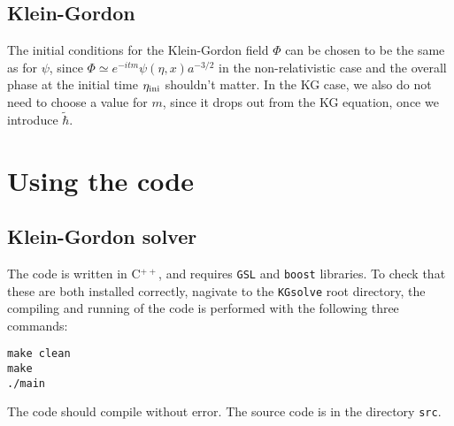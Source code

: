 \documentclass[amsmath,amssymb,12pt, eqsecnum]{revtex4}
\begin{document}
\subsection{Klein-Gordon}
The initial conditions for the Klein-Gordon field $\Phi$ can be chosen to be the same as for $\psi$, since $\Phi \simeq e^{- i t m} \psi(\eta, x) a^{-3/2}$  in the non-relativistic case and the overall phase at the initial time $\eta_{\rm ini}$ shouldn't matter. In the KG case, we also do not need to choose a value for $m$, since it drops out from the KG equation, once we introduce $\tilde \hbar$.
\appendix
\section{Using the code}
\subsection{Klein-Gordon solver}
The code is written in C$^{++}$, and requires {\tt GSL} and {\tt boost} libraries. To check that these are both installed correctly, nagivate to the {\tt KGsolve} root directory, the compiling and running of the code is performed with the following three commands:
\begin{verbatim}
make clean
make
./main
\end{verbatim}
The code should compile without error. The source code is in the directory {\tt src}.
\end{document}
